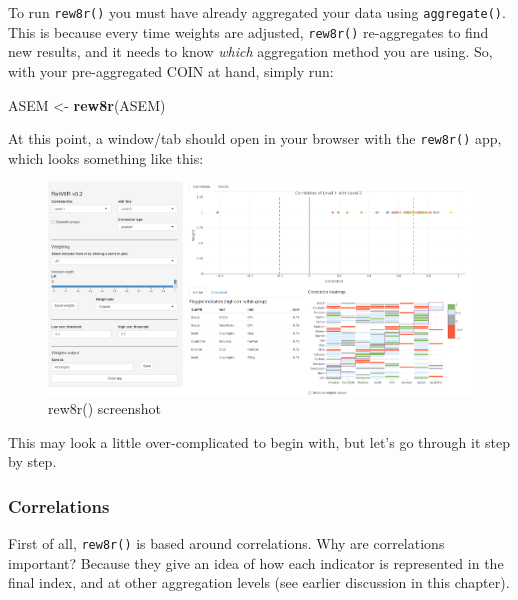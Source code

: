 \documentclass[
]{book}
\newenvironment{Shaded}{\begin{snugshade}}{\end{snugshade}}
\newcommand{\KeywordTok}[1]{\textcolor[rgb]{0.13,0.29,0.53}{\textbf{#1}}}
\newcommand{\NormalTok}[1]{#1}
\newcommand{\StringTok}[1]{\textcolor[rgb]{0.31,0.60,0.02}{#1}}
\begin{document}
To run \texttt{rew8r()} you must have already aggregated your data using \texttt{aggregate()}. This is because every time weights are adjusted, \texttt{rew8r()} re-aggregates to find new results, and it needs to know \emph{which} aggregation method you are using. So, with your pre-aggregated COIN at hand, simply run:

\begin{Shaded}
\begin{Highlighting}[]
\NormalTok{ASEM <-}\StringTok{ }\KeywordTok{rew8r}\NormalTok{(ASEM)}
\end{Highlighting}
\end{Shaded}

At this point, a window/tab should open in your browser with the \texttt{rew8r()} app, which looks something like this:

\begin{figure}

{\centering \includegraphics[width=1\linewidth]{images/rew8r_screenshot} 

}

\caption{rew8r() screenshot}\label{fig:unnamed-chunk-45}
\end{figure}

This may look a little over-complicated to begin with, but let's go through it step by step.

\hypertarget{correlations}{%
\subsubsection{Correlations}\label{correlations}}

First of all, \texttt{rew8r()} is based around correlations. Why are correlations important? Because they give an idea of how each indicator is represented in the final index, and at other aggregation levels (see earlier discussion in this chapter).
\end{document}
